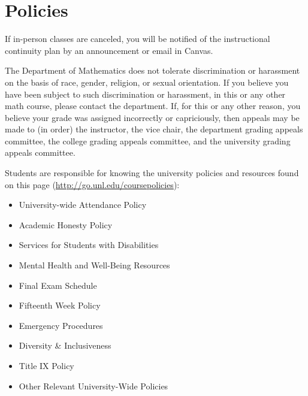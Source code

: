 \documentclass[11pt]{article}
\begin{document}
\section*{Policies}
\vspace{-.5em}
\begin{description}[nosep]

\item[Instructional Continuity Plans for when Classes are Canceled] If in-person classes are canceled, you will be notified of the instructional continuity plan by an announcement or email in Canvas.\vspace{.25em}

\item[Departmental Grading Appeals] The Department of Mathematics does not tolerate discrimination or harassment on the basis of race, gender, religion, or sexual orientation. If you believe you have been subject to such discrimination or harassment, in this or any other math course, please contact the department. If, for this or any other reason, you believe your grade was assigned incorrectly or capriciously, then appeals may be made to (in order) the instructor, the vice chair, the department grading appeals committee, the college grading appeals committee, and the university grading appeals committee.\vspace{.25em}


\item[University Policies] Students are responsible for knowing the university policies and resources found on this page (\href{http://go.unl.edu/coursepolicies}{http://go.unl.edu/coursepolicies}):
\begin{itemize}
    \item University-wide Attendance Policy
    \item Academic Honesty Policy
    \item Services for Students with Disabilities
    \item Mental Health and Well-Being Resources
    \item Final Exam Schedule
    \item Fifteenth Week Policy
    \item Emergency Procedures
    \item Diversity \& Inclusiveness
    \item Title IX Policy
    \item Other Relevant University-Wide Policies
\end{itemize}
\end{description}
\end{document}

